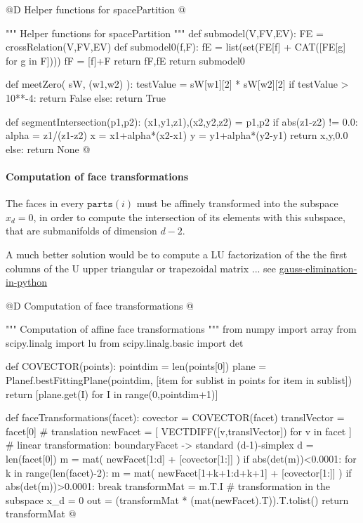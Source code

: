 \documentclass[11pt,oneside]{article}    %
\begin{document}
@D Helper functions for spacePartition
@{""" Helper functions for spacePartition """
def submodel(V,FV,EV):
    FE = crossRelation(V,FV,EV)
    def submodel0(f,F):
        fE = list(set(FE[f] + CAT([FE[g] for g in F])))
        fF = [f]+F
        return fF,fE
    return submodel0

def meetZero( sW, (w1,w2) ):
    testValue = sW[w1][2] * sW[w2][2]
    if testValue > 10**-4: 
        return False
    else: return True

def segmentIntersection(p1,p2):
    (x1,y1,z1),(x2,y2,z2) = p1,p2
    if abs(z1-z2) != 0.0:
        alpha = z1/(z1-z2)
        x = x1+alpha*(x2-x1)
        y = y1+alpha*(y2-y1)
        return x,y,0.0
    else: return None
@}



\paragraph{Computation of face transformations}
The faces in every $\texttt{parts}(i)$ must be affinely transformed into the subspace $x_d=0$, in order to compute the intersection of its elements with this subspace, that are submanifolds of dimension $d-2$. 

A much better solution would be to compute a LU factorization of the the first columns of the U upper triangular or trapezoidal matrix ... see \href{http://stackoverflow.com/questions/15638650/is-there-a-standard-solution-for-gauss-elimination-in-python}{gauss-elimination-in-python}

@D Computation of face transformations
@{""" Computation of affine face transformations """
from numpy import array
from scipy.linalg import lu
from scipy.linalg.basic import det

def COVECTOR(points):
    pointdim = len(points[0])
    plane = Planef.bestFittingPlane(pointdim,
                    [item for sublist in points for item in sublist])
    return [plane.get(I) for I in range(0,pointdim+1)]

def faceTransformations(facet):
    covector = COVECTOR(facet)
    translVector = facet[0]
    # translation 
    newFacet = [ VECTDIFF([v,translVector]) for v in facet ]
    # linear transformation: boundaryFacet -> standard (d-1)-simplex
    d = len(facet[0])
    m = mat( newFacet[1:d] + [covector[1:]] )
    if abs(det(m))<0.0001:
        for k in range(len(facet)-2):
            m = mat( newFacet[1+k+1:d+k+1] + [covector[1:]] )
            if abs(det(m))>0.0001: break
    transformMat = m.T.I
    # transformation in the subspace x_d = 0
    out = (transformMat * (mat(newFacet).T)).T.tolist()
    return transformMat
@}
    
\end{document}
